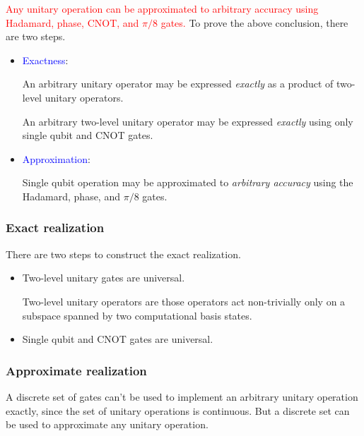 \documentclass{article}
\begin{document}
\textcolor{red}{Any unitary operation can be approximated to arbitrary accuracy using Hadamard, phase, CNOT, and $\pi/8$ gates.}
To prove the above conclusion, there are two steps.
\begin{itemize}
	\item \textcolor{blue}{Exactness}:
	
	An arbitrary unitary operator may be expressed \textit{exactly} as a product of two-level unitary operators. 
	
	An arbitrary two-level unitary operator may be expressed \textit{exactly} using only single qubit and CNOT gates.
	
	\item \textcolor{blue}{Approximation}:
	
	Single qubit operation may be approximated to \textit{arbitrary accuracy} using the Hadamard, phase, and $\pi/8$ gates.
\end{itemize}



\subsubsection{Exact realization}
There are two steps to construct the exact realization.
\begin{itemize}
	\item Two-level unitary gates are universal.
	
	Two-level unitary operators are those operators act non-trivially only on a subspace spanned by two computational basis states.
	
	\item Single qubit and CNOT gates are universal.
\end{itemize}


\subsubsection{Approximate realization}
A discrete set of gates can't be used to implement an arbitrary unitary operation exactly, since the set of unitary operations is continuous. But a discrete set can be used to approximate any unitary operation.
\end{document}
